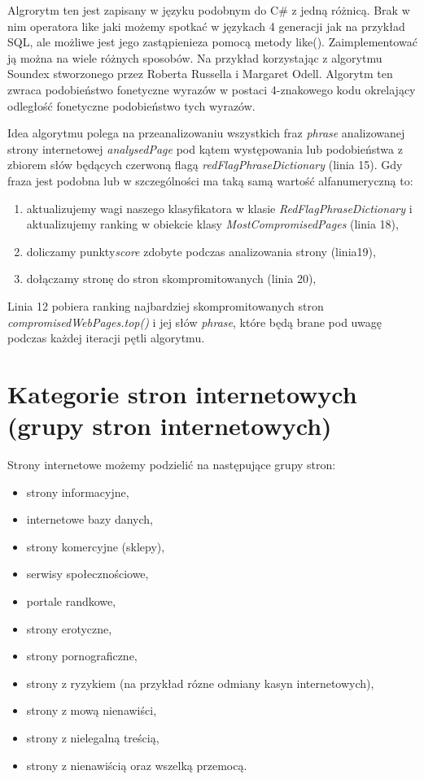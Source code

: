 \documentclass[9pt,a4paper]{extarticle}
\begin{document}
\begin{multicols}{2}
Algrorytm ten jest zapisany w języku podobnym do C\# z jedną różnicą. Brak w nim operatora like jaki możemy spotkać w językach 4 generacji jak na przykład SQL, ale możliwe jest jego zastąpienieza pomocą metody like(). Zaimplementować ją można na wiele różnych sposobów. Na przykład korzystając z algorytmu Soundex stworzonego przez Roberta Russella i Margaret Odell\cite{donald_e._knuth_art_2002}. Algorytm ten zwraca podobieństwo fonetyczne wyrazów w postaci 4-znakowego kodu okrelający odległość fonetyczne podobieństwo tych wyrazów.

Idea algorytmu polega na przeanalizowaniu wszystkich fraz \textit{phrase} analizowanej strony internetowej \textit{analysedPage} pod kątem występowania lub podobieństwa z zbiorem słów będących czerwoną flagą \textit{redFlagPhraseDictionary} (linia 15). Gdy fraza jest podobna lub w szczególności ma taką samą wartość alfanumeryczną to:
\begin{enumerate}
\item aktualizujemy wagi naszego klasyfikatora w klasie \textit{RedFlagPhraseDictionary} i aktualizujemy ranking w obiekcie klasy \textit{MostCompromisedPages} (linia 18),
\item doliczamy punkty\textit{score} zdobyte podczas analizowania strony (linia19),
\item dołączamy stronę do stron skompromitowanych (linia 20),
\end{enumerate}
Linia 12 pobiera ranking najbardziej skompromitowanych stron \textit{compromisedWebPages.top()} i jej słów \textit{phrase}, które będą brane pod uwagę podczas każdej iteracji pętli algorytmu.

\section{Kategorie stron internetowych (grupy stron internetowych)}
Strony internetowe możemy podzielić na następujące grupy stron:
\begin{itemize}
\item strony informacyjne,
\item	internetowe bazy danych,
\item	strony komercyjne (sklepy),
\item	serwisy społecznościowe,
\item	portale randkowe,
\item	strony erotyczne,
\item	strony pornograficzne,
\item	strony z ryzykiem (na przykład rózne odmiany kasyn internetowych),
\item	strony z mową nienawiści,
\item	strony z nielegalną treścią,
\item	strony z nienawiścią oraz wszelką przemocą.
\end{itemize}


\end{multicols}
\end{document}
